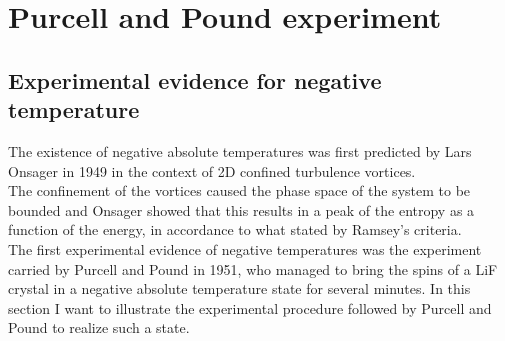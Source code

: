 \chapter{Purcell and Pound experiment}
\label{ch:PandP}
\section{Experimental evidence for negative temperature}
The existence of negative absolute temperatures was first predicted by Lars Onsager in 1949 \cite{Onsager} in the context of 2D confined turbulence vortices. \\
The confinement of the vortices caused the phase space of the system to be bounded and Onsager showed that this results in a peak of the entropy as a function of the energy, in accordance
to what stated by Ramsey's criteria. \\
The first experimental evidence of negative temperatures was the experiment carried by Purcell and Pound \cite{PandP} in 1951, who managed to bring the spins of a LiF crystal in a negative absolute temperature
state for several minutes.
In this section I want to illustrate the experimental procedure followed by Purcell and Pound to realize such a state.\\

